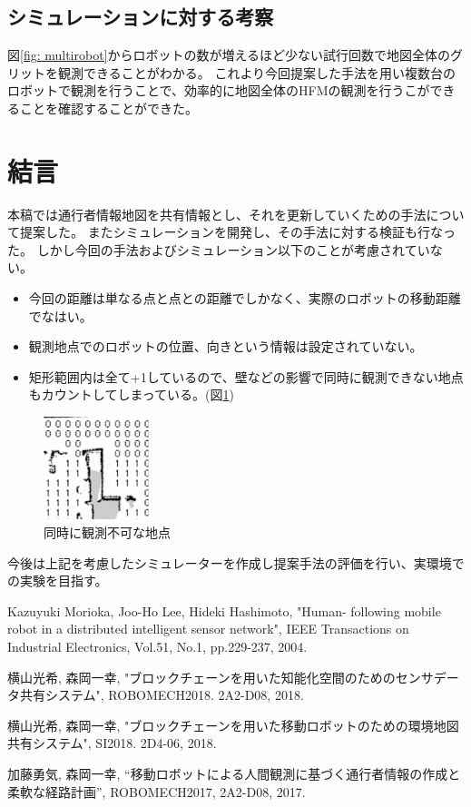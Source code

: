 \documentclass{jsarticle}
\begin{document}
\subsection{シミュレーションに対する考察}
図\ref{fig: multirobot}からロボットの数が増えるほど少ない試行回数で地図全体のグリットを観測できることがわかる。
これより今回提案した手法を用い複数台のロボットで観測を行うことで、効率的に地図全体のHFMの観測を行うこができることを確認することができた。




\section{結言}
本稿では通行者情報地図を共有情報とし、それを更新していくための手法について提案した。
またシミュレーションを開発し、その手法に対する検証も行なった。
しかし今回の手法およびシミュレーション以下のことが考慮されていない。
\begin{itemize}
  \item 今回の距離は単なる点と点との距離でしかなく、実際のロボットの移動距離でなはい。
  \item 観測地点でのロボットの位置、向きという情報は設定されていない。
  \item 矩形範囲内は全て+1しているので、壁などの影響で同時に観測できない地点もカウントしてしまっている。(図\ref{fig: impossible})
\end{itemize}
\begin{figure}[tbh]
 \centering
  \includegraphics[height=30mm]{fig/impossible.eps}
  \vspace*{-4mm}
  \caption{同時に観測不可な地点}
  \label{fig: impossible}
\end{figure}

今後は上記を考慮したシミュレーターを作成し提案手法の評価を行い、実環境での実験を目指す。






\footnotesize
\begin{thebibliography}{99}

Kazuyuki Morioka, Joo-Ho Lee, Hideki Hashimoto, "Human- following mobile robot in a distributed intelligent sensor network", IEEE Transactions on Industrial Electronics, Vol.51, No.1, pp.229-237, 2004.

横山光希, 森岡一幸, "ブロックチェーンを用いた知能化空間のためのセンサデータ共有システム", ROBOMECH2018. 2A2-D08, 2018.

横山光希, 森岡一幸, "ブロックチェーンを用いた移動ロボットのための環境地図共有システム", SI2018. 2D4-06, 2018.

加藤勇気, 森岡一幸, “移動ロボットによる人間観測に基づく通行者情報の作成と柔軟な経路計画”, ROBOMECH2017, 2A2-D08, 2017.




\end{thebibliography}

\normalsize
\end{document}
